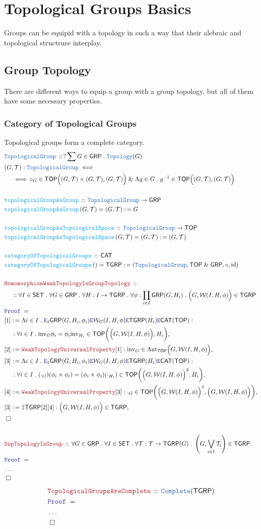 \documentclass[12pt]{scrartcl}
\newcommand{\TYPE}[1]{\textcolor{NavyBlue}{\mathtt{#1}}}
\newcommand{\FUNC}[1]{\textcolor{Cerulean}{\mathtt{#1}}}
\newcommand{\LOGIC}[1]{\textcolor{Blue}{\mathtt{#1}}}
\newcommand{\THM}[1]{\textcolor{Maroon}{\mathtt{#1}}}
\renewcommand{\.}{\; . \;}
\newcommand{\de}{: \kern 0.1pc =}
\newcommand{\Act}[1]{\left( #1 \right)}
\newcommand{\Theorem}[2]{& \THM{#1} \, :: \, #2 \\ & \Proof = \\ }
\newcommand{\DeclareType}[2]{& \TYPE{#1} \, :: \, #2 \\}
\newcommand{\DefineType}[3]{& #1 : \TYPE{#2} \iff #3 \\}
\newcommand{\DeclareFunc}[2]{& \FUNC{#1} \, :: \, #2 \\}
\newcommand{\DefineNamedFunc}[4]{&  \FUNC{#1}\Act{#2} = #3 \de #4 \\}
\newcommand{\NewLine}{\\ & \kern 1pc}
\newcommand{\Page}[1]{ \begin{align*} #1 \end{align*}   }
\newcommand{\NoProof}{ & \ldots \\ \EndProof}
\renewcommand{\And}{\; \& \;}
\DeclareMathOperator*{\id}{id}
\newcommand{\Aut}{\mathrm{Aut}}
\newcommand{\Say}[3]{& #1 \de #2 : #3, \\}
\newcommand{\Intro}{\LOGIC{I}}
\newcommand{\Elim}{\LOGIC{E}}
\newcommand{\QED}{\; \square}
\newcommand{\EndProof}{& \QED \\}
\newcommand{\Proof}{\LOGIC{Proof} \; }
\newcommand{\CAT}{\mathsf{CAT}}
\newcommand{\SET}{\mathsf{SET}}
\newcommand{\TOP}{\mathsf{TOP}}
\newcommand{\T}{\mathcal{T}}
\newcommand{\GRP}{\mathsf{GRP}}
\newcommand{\inv}{\mathrm{inv}}
\newcommand{\TGRP}{\mathsf{TGRP}}
\newcommand{\W}{\mathcal{W}}
\begin{document}
\section{Topological Groups Basics}
Groups can be equipid with a topology in such a way that their alebraic and topological structrure interplay.
\subsection{Group Topology}
There are different ways to equip a group with a group topology, 
but all of them have some necessary properties.
\subsubsection{Category of Topological Groups}
Topological groups form a complete category.
\Page{
	\DeclareType{TopologicalGroup}
	{
		?\sum G \in \GRP \. \TYPE{Topology}(G)
	}
	\DefineType{(G,\T)}{TopologicalGroup}
	{
		\NewLine \iff		
		\circ_G \in \TOP\Big((G,\T) \times (G,\T),(G,\T)\Big)
		\And
		\Lambda g \in G \. g^{-1} \in \TOP\Big((G,\T),(G,\T)\Big)
	}
	\\
	\DeclareFunc{topologicalGroupAsGroup}
	{
		\TYPE{TopologicalGroup} \to \GRP
	}
	\DefineNamedFunc{topologicalGroupAsGroup}{G,\T}{(G,\T)}
	{
		G
	}
	\\
	\DeclareFunc{topologicalGroupAsTopologicalSpace}
	{
		\TYPE{TopologicalGroup} \to \TOP
	}
	\DefineNamedFunc{topologicalGroupAsTopologicalSpace}{G,\T}{(G,\T)}
	{
		(G,\T)
	}
	\\
	\DeclareFunc{categoryOfTopologicalGroups}{\CAT}
	\DefineNamedFunc{categoryOfTopologicalGroups}{}{\TGRP}
	{
		( \TYPE{TopologicalGroup}, \TOP \And \GRP, \circ, \id)	
	}
	\\
	\Theorem{HomomorphismWeakTopologyIsGroupTopology}
	{
		\NewLine ::		
		\forall I \in \SET \.
		\forall G \in \GRP \.
		\forall H : I \to \TGRP \. 
		\forall \phi : \prod_{i \in I} \GRP(G,H_i) \.
		\Big(G,\W(I,H,\phi)\Big) \in \TGRP
	}
	\Say{[1]}
	{
		\Lambda i \in I \. 
		\Elim_2 \GRP(G,H_i,\phi_i)
		\Elim \W_G(I,H,\phi)
		\Elim \TGRP(H_i)
		\Elim \CAT(\TOP)
	}
	{
		\NewLine :
		\forall i \in I \.		
		\inv_G \phi_i = \phi_i \inv_{H_i} \in 
		\TOP\bigg(\Big(G,\W(I,H,\phi)\Big),H_i\bigg)
	}
	\Say{[2]}{\THM{WeakTopologyUniversalProperty}[1]}
	{
		\inv_G \in \Aut_\TOP\Big(G,\W(I,H,\phi)\Big)
	}
	\Say{[3]}
	{
		\Lambda i \in I \. 
		\Elim_1 \GRP(G,H_i,\phi_i)
		\Elim \W_G(I,H,\phi)
		\Elim \TGRP(H_i)
		\Elim \CAT(\TOP)
	}
	{
		\NewLine :
		\forall i \in I \.		
		(\cdot_G) (\phi_i \times \phi_i) = (\phi_i \times \phi_i) (\cdot_{H_i}) \in 
		\TOP\bigg(\Big(G,\W(I,H,\phi)\Big)^2,H_i\bigg)
	}
	\Say{[4]}{\THM{WeakTopologyUniversalProperty}[3]}
	{
		\cdot_G \in \TOP\bigg(\Big(G,\W(I,H,\phi)\Big)^2,\Big(G,\W(I,H,\phi)\Big)\bigg)
	}
	\Say{[3]}{\Intro \TGRP [2][4]}
	{
		\Big(G,\W(I,H,\phi)\Big) \in \TGRP
	}
	\EndProof
	\\
	\Theorem{SupTopologyIsGroup}
	{
		\forall G \in \GRP \.
		\forall I \in \SET \.
		\forall \T : \T \to \TGRP(G) \.
		\left(G,\bigvee_{i \in I} \T_i \right) \in \TGRP
	}
	\NoProof
}\Page{
	\Theorem{TopologicalGroupsAreComplete}
	{
		\TYPE{Complete}(\TGRP)
	}
	\NoProof
}
\newpage
\end{document}
